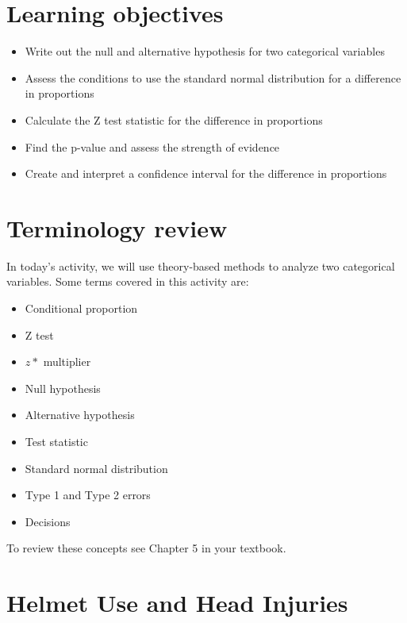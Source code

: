 \documentclass[
]{report}
\begin{document}
\hypertarget{learning-objectives}{%
\section{Learning objectives}\label{learning-objectives}}

\begin{itemize}
\item
  Write out the null and alternative hypothesis for two categorical variables
\item
  Assess the conditions to use the standard normal distribution for a difference in proportions
\item
  Calculate the Z test statistic for the difference in proportions
\item
  Find the p-value and assess the strength of evidence
\item
  Create and interpret a confidence interval for the difference in proportions
\end{itemize}

\hypertarget{terminology-review}{%
\section{Terminology review}\label{terminology-review}}

In today's activity, we will use theory-based methods to analyze two categorical variables. Some terms covered in this activity are:

\begin{itemize}
\item
  Conditional proportion
\item
  Z test
\item
  \(z*\) multiplier
\item
  Null hypothesis
\item
  Alternative hypothesis
\item
  Test statistic
\item
  Standard normal distribution
\item
  Type 1 and Type 2 errors
\item
  Decisions
\end{itemize}

To review these concepts see Chapter 5 in your textbook.

\newpage

\hypertarget{helmet-use-and-head-injuries}{%
\section{Helmet Use and Head Injuries}\label{helmet-use-and-head-injuries}}
\end{document}
